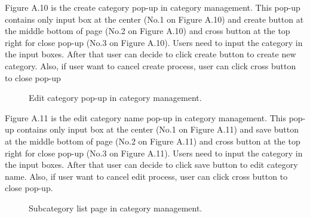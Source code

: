 \documentclass[12pt,oneside,openright,a4paper]{cpe-english-project}
\begin{document}
Figure A.10 is the create category pop-up in category management. This pop-up
contains only input box at the center (No.1 on Figure A.10) and create button at the middle 
bottom of page (No.2 on Figure A.10) and cross button at the top right for close pop-up (No.3 
on Figure A.10).
Users need to input the category in the input boxes. After that user can decide to 
click create button to create new category. Also, if user want to cancel create process, user 
can click cross button to close pop-up \\
\begin{figure}[!h]\centering
{}
\caption{Edit category pop-up in category management.
}\label{fig:Edit category pop-up in category management.
}
\end{figure}

Figure A.11 is the edit category name pop-up in category management. This pop-up 
contains only input box at the center (No.1 on Figure A.11) and save button at the middle 
bottom of page (No.2 on Figure A.11) and cross button at the top right for close pop-up (No.3
on Figure A.11).
Users need to input the category in the input boxes. After that user can decide to 
click save button to edit category name. Also, if user want to cancel edit process, user can 
click cross button to close pop-up.\\

\begin{figure}[!h]\centering
{}
\caption{Subcategory list page in category management.
}\label{fig:Subcategory list page in category management.
}
\end{figure} \\
\end{document}
